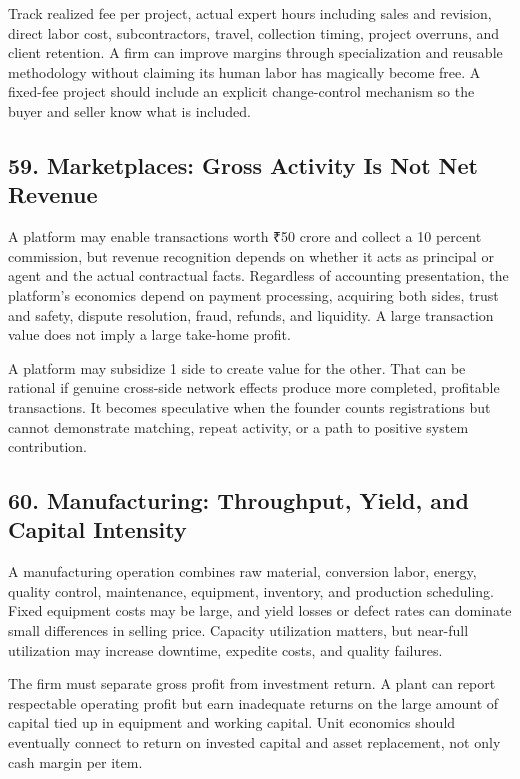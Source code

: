 Track realized fee per project, actual expert hours including sales and revision, direct labor cost, subcontractors, travel, collection timing, project overruns, and client retention. A firm can improve margins through specialization and reusable methodology without claiming its human labor has magically become free. A fixed-fee project should include an explicit change-control mechanism so the buyer and seller know what is included.

\subsection*{59. Marketplaces: Gross Activity Is Not Net Revenue}

A platform may enable transactions worth ₹50 crore and collect a 10 percent commission, but revenue recognition depends on whether it acts as principal or agent and the actual contractual facts. Regardless of accounting presentation, the platform's economics depend on payment processing, acquiring both sides, trust and safety, dispute resolution, fraud, refunds, and liquidity. A large transaction value does not imply a large take-home profit.

A platform may subsidize 1 side to create value for the other. That can be rational if genuine cross-side network effects produce more completed, profitable transactions. It becomes speculative when the founder counts registrations but cannot demonstrate matching, repeat activity, or a path to positive system contribution.

\subsection*{60. Manufacturing: Throughput, Yield, and Capital Intensity}

A manufacturing operation combines raw material, conversion labor, energy, quality control, maintenance, equipment, inventory, and production scheduling. Fixed equipment costs may be large, and yield losses or defect rates can dominate small differences in selling price. Capacity utilization matters, but near-full utilization may increase downtime, expedite costs, and quality failures.

The firm must separate gross profit from investment return. A plant can report respectable operating profit but earn inadequate returns on the large amount of capital tied up in equipment and working capital. Unit economics should eventually connect to return on invested capital and asset replacement, not only cash margin per item.

